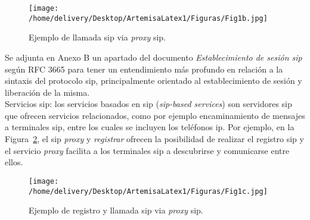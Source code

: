 \documentclass[a4paper,12pt]{report}
\begin{document}
\begin{figure}[h!] 
\centering
\texttt{[image: /home/delivery/Desktop/ArtemisaLatex1/Figuras/Fig1b.jpg]}
\caption{Ejemplo de llamada \ac{sip} via \emph{proxy} \ac{sip}.}
\label{ej_llamada_sip_proxy}
\end{figure}

\newpage

Se adjunta en Anexo B un apartado del documento \emph{Establecimiento de
sesión \ac{sip}} según RFC 3665 para tener un
entendimiento más profundo en relación a la sintaxis del protocolo \ac{sip},
principalmente orientado al establecimiento de sesión y liberación de la
misma.\\

Servicios \ac{sip}: los servicios basados en \ac{sip} (\emph{\ac{sip}-based services}) son servidores
\ac{sip} que ofrecen servicios relacionados, como por ejemplo encaminamiento de mensajes a
terminales \ac{sip}, entre los cuales se incluyen los teléfonos \ac{ip}. Por ejemplo, en la 
Figura~\ref{ej_reg_y_call_sip}, el \ac{sip} \emph{proxy} y \emph{registrar} ofrecen la posibilidad de
realizar el registro \ac{sip} y el servicio \emph{proxy} facilita a los terminales \ac{sip} 
a descubrirse y comunicarse entre ellos.

\begin{figure}[h!] 
\centering
\texttt{[image: /home/delivery/Desktop/ArtemisaLatex1/Figuras/Fig1c.jpg]}
\caption{Ejemplo de registro y llamada \ac{sip} via \emph{proxy} \ac{sip}. \cite{weichen}} 
\label{ej_reg_y_call_sip}
\end{figure}
\end{document}
